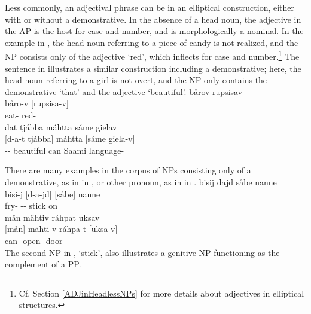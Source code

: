 Less commonly, an adjectival phrase can be in an elliptical construction, either with or without a demonstrative. In the absence of a head noun, the adjective in the AP is the host for case and number, and is morphologically a nominal. In the example in , the head noun referring to a piece of candy is not realized, and the NP consists only of the adjective  ‘red’, which inflects for case and number.\footnote{Cf. Section \ref{ADJinHeadlessNPs} for more details about adjectives in elliptical structures.} 
The sentence in  illustrates a similar construction including a demonstrative; here, the head noun referring to a girl is not overt, and the NP only contains the demonstrative  ‘that’ and the adjective  ‘beautiful’. 
\ea\label{NPstructureEx8}
\glll	bårov rupsisav\\
	båro-v {[rupsisa-v]\subNP}\\
	eat- red-\\\nopagebreak
{}	
\z
\ea\label{adjNPheadEx3repeat}%
\glll	dat tjábba máhtta sáme gielav\\
	{[d-a-t} {tjábba]\subNP{}} máhtta {[sáme} {giela-v]\subNP{}}\\
	-- beautiful\BS{} can\BS{} Saami\BS{} language-\\\nopagebreak
{}	
\z

There are many examples in the corpus of NPs consisting only of a demonstrative, as in  in , or other pronoun, as in  in . %
\ea\label{NPstructureProEx1}
\glll	bisij dajd såbe nanne\\
	bisi-j {[d-a-jd]\subNP{}} {[såbe]\subNP{}} nanne\\
	fry- -- stick\BS{} on\\\nopagebreak
{}	
\z
\ea\label{NPstructureProEx2}
\glll	mån mähtiv ráhpat uksav\\
	{[mån]\subNP{}} mähti-v ráhpa-t {[uksa-v]\subNP{}}\\
	 can- open- door-\\\nopagebreak
{}	
\z
The second NP in ,  ‘stick’, also illustrates a genitive NP functioning as the complement of a PP. 

